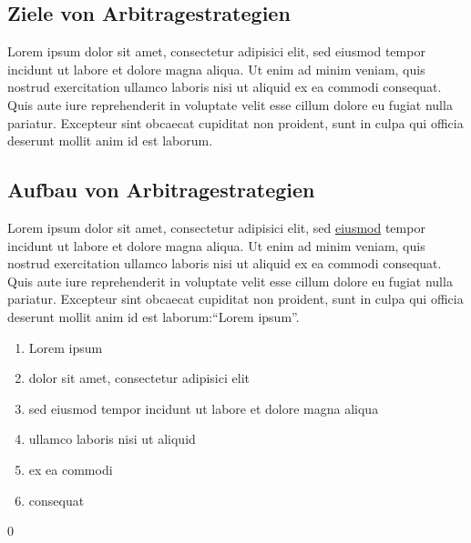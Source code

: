 \subsection{Ziele von Arbitragestrategien}
Lorem ipsum dolor sit amet, consectetur adipisici elit, sed eiusmod tempor incidunt ut labore et dolore magna aliqua. Ut enim ad minim veniam, quis nostrud exercitation ullamco laboris nisi ut aliquid ex ea commodi consequat. Quis aute iure reprehenderit in voluptate velit esse cillum dolore eu fugiat nulla pariatur. Excepteur sint obcaecat cupiditat non proident, sunt in culpa qui officia deserunt mollit anim id est laborum.\\

\subsection{Aufbau von Arbitragestrategien}
Lorem ipsum dolor sit amet, consectetur adipisici elit, sed \underline{eiusmod} tempor incidunt ut labore et dolore magna aliqua. Ut enim ad minim veniam, quis nostrud exercitation ullamco laboris nisi ut aliquid ex ea commodi consequat. Quis aute iure reprehenderit in voluptate velit esse cillum dolore eu fugiat nulla pariatur. Excepteur sint obcaecat cupiditat non proident, sunt in culpa qui officia deserunt mollit anim id est laborum:``Lorem ipsum''.

\renewcommand{\labelenumi}{\roman{enumi})}
\begin{enumerate}
\item Lorem ipsum
\item dolor sit amet, consectetur adipisici elit
\item sed eiusmod tempor incidunt ut labore et dolore magna aliqua
\item ullamco laboris nisi ut aliquid
\item ex ea commodi
\item consequat
\end{enumerate}

\setcounter {footnote} {0}
